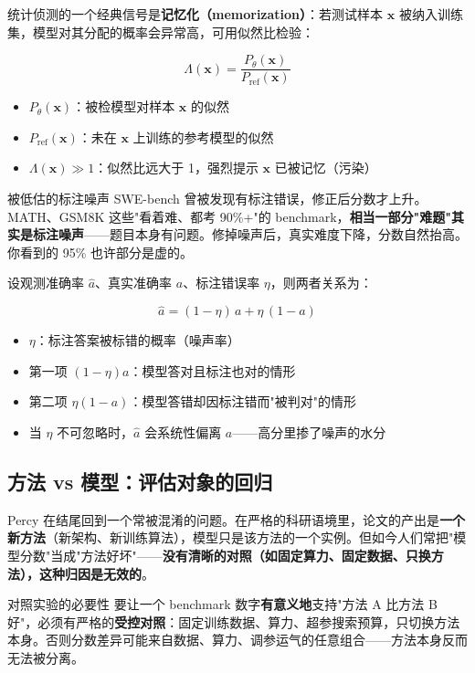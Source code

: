 \documentclass[a4paper]{article}
\begin{document}
统计侦测的一个经典信号是\textbf{记忆化（memorization）}：若测试样本 $\mathbf{x}$ 被纳入训练集，模型对其分配的概率会异常高，可用似然比检验：

\[
\Lambda(\mathbf{x}) = \frac{P_\theta(\mathbf{x})}{P_{\text{ref}}(\mathbf{x})}
\]

\begin{itemize}
\item $P_\theta(\mathbf{x})$：被检模型对样本 $\mathbf{x}$ 的似然
\item $P_{\text{ref}}(\mathbf{x})$：未在 $\mathbf{x}$ 上训练的参考模型的似然
\item $\Lambda(\mathbf{x}) \gg 1$：似然比远大于 1，强烈提示 $\mathbf{x}$ 已被记忆（污染）
\end{itemize}

\begin{warningbox}{被低估的标注噪声}
SWE-bench 曾被发现有标注错误，修正后分数才上升。MATH、GSM8K 这些"看着难、都考 90\%+"的 benchmark，\textbf{相当一部分"难题"其实是标注噪声}——题目本身有问题。修掉噪声后，真实难度下降，分数自然抬高。你看到的 95\% 也许部分是虚的。
\end{warningbox}

设观测准确率 $\hat{a}$、真实准确率 $a$、标注错误率 $\eta$，则两者关系为：

\[
\hat{a} = (1-\eta)\, a + \eta\,(1-a)
\]

\begin{itemize}
\item $\eta$：标注答案被标错的概率（噪声率）
\item 第一项 $(1-\eta)a$：模型答对且标注也对的情形
\item 第二项 $\eta(1-a)$：模型答错却因标注错而"被判对"的情形
\item 当 $\eta$ 不可忽略时，$\hat{a}$ 会系统性偏离 $a$——高分里掺了噪声的水分
\end{itemize}

\subsection{方法 vs 模型：评估对象的回归}

Percy 在结尾回到一个常被混淆的问题。在严格的科研语境里，论文的产出是\textbf{一个新方法}（新架构、新训练算法），模型只是该方法的一个实例。但如今人们常把"模型分数"当成"方法好坏"——\textbf{没有清晰的对照（如固定算力、固定数据、只换方法），这种归因是无效的}。

\begin{importantbox}{对照实验的必要性}
要让一个 benchmark 数字\textbf{有意义地}支持"方法 A 比方法 B 好"，必须有严格的\textbf{受控对照}：固定训练数据、算力、超参搜索预算，只切换方法本身。否则分数差异可能来自数据、算力、调参运气的任意组合——方法本身反而无法被分离。
\end{importantbox}
\end{document}
